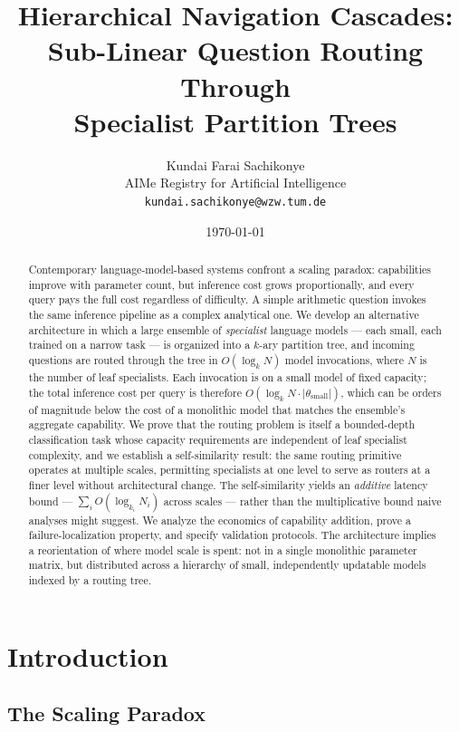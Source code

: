 \documentclass[11pt,twocolumn,a4paper]{article}
\title{Hierarchical Navigation Cascades:\\
Sub-Linear Question Routing Through\\
Specialist Partition Trees}
\author{
Kundai Farai Sachikonye\\
AIMe Registry for Artificial Intelligence\\
\texttt{kundai.sachikonye@wzw.tum.de}
}
\date{\today}
\theoremstyle{definition}
\theoremstyle{remark}
\begin{document}
\maketitle

\begin{abstract}
Contemporary language-model-based systems confront a scaling paradox: capabilities improve with parameter count, but inference cost grows proportionally, and every query pays the full cost regardless of difficulty. A simple arithmetic question invokes the same inference pipeline as a complex analytical one. We develop an alternative architecture in which a large ensemble of \emph{specialist} language models --- each small, each trained on a narrow task --- is organized into a $k$-ary partition tree, and incoming questions are routed through the tree in $O(\log_k N)$ model invocations, where $N$ is the number of leaf specialists. Each invocation is on a small model of fixed capacity; the total inference cost per query is therefore $O(\log_k N \cdot |\theta_{\text{small}}|)$, which can be orders of magnitude below the cost of a monolithic model that matches the ensemble's aggregate capability. We prove that the routing problem is itself a bounded-depth classification task whose capacity requirements are independent of leaf specialist complexity, and we establish a self-similarity result: the same routing primitive operates at multiple scales, permitting specialists at one level to serve as routers at a finer level without architectural change. The self-similarity yields an \emph{additive} latency bound --- $\sum_i O(\log_{k_i} N_i)$ across scales --- rather than the multiplicative bound naive analyses might suggest. We analyze the economics of capability addition, prove a failure-localization property, and specify validation protocols. The architecture implies a reorientation of where model scale is spent: not in a single monolithic parameter matrix, but distributed across a hierarchy of small, independently updatable models indexed by a routing tree.
\end{abstract}

\section{Introduction}
\label{sec:intro}

\subsection{The Scaling Paradox}
\end{document}
